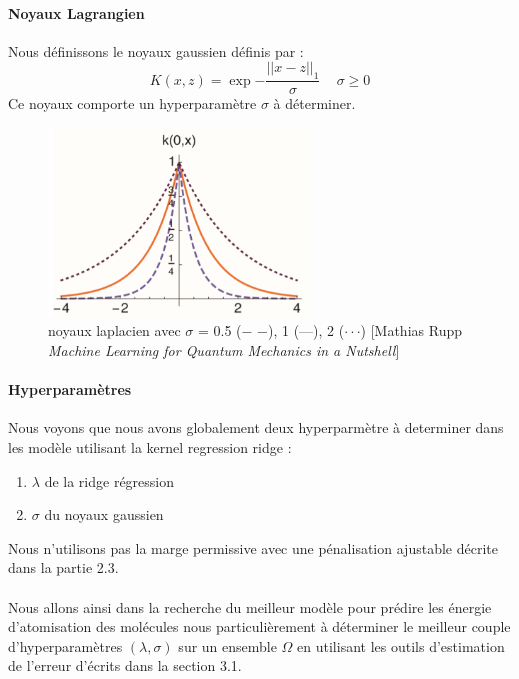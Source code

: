\documentclass[a4paper,12pt,titlepage]{report}
\begin{document}
\paragraph{Noyaux Lagrangien}
Nous définissons le noyaux gaussien définis par :
\[ 
	K(x,z) = \exp{- \frac{||x-z||_{1}}{\sigma}} \, \quad \sigma \geqslant 0 
\]
Ce noyaux comporte un hyperparamètre $\sigma$ à déterminer.
\begin{figure}[!h]
	\begin{center}
		\includegraphics[height = 5cm, keepaspectratio]{graphes/noyaux_laplacien.png}
		\caption{noyaux laplacien avec $\sigma$ = 0.5 ($-$ $-$), 1 (---), 2 ($\cdot\cdot\cdot$) [Mathias Rupp \textit{Machine Learning for Quantum Mechanics in a Nutshell}]}
	\end{center}
\end{figure}

\paragraph{Hyperparamètres}
Nous voyons que nous avons globalement deux hyperparmètre à determiner dans  les modèle utilisant la kernel regression ridge :
\begin{enumerate}
 	\item $\lambda$ de la ridge régression
    \item $\sigma$ du noyaux gaussien
\end{enumerate}
Nous n'utilisons pas la marge permissive avec une pénalisation ajustable décrite dans la partie 2.3.
\paragraph{}
Nous allons ainsi dans la recherche du meilleur modèle pour prédire les énergie d'atomisation des molécules nous  particulièrement à déterminer le meilleur couple d'hyperparamètres $(\lambda, \sigma)$ sur un ensemble $\Omega$ en utilisant les outils d'estimation de l'erreur d'écrits dans la section 3.1. 
\end{document}
